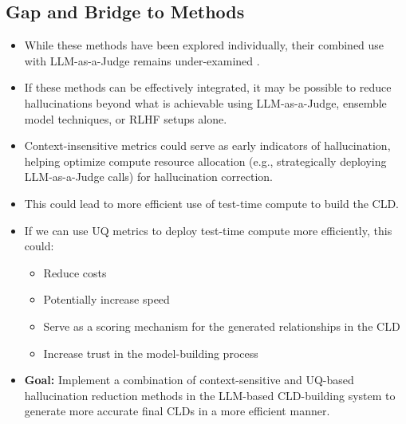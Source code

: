 \documentclass[12pt]{article}
\begin{document}
\subsection{Gap and Bridge to Methods}

\begin{itemize}
    \item While these methods have been explored individually, their combined use with LLM-as-a-Judge remains under-examined \cite{tonmoy2024comprehensive}.
    \item If these methods can be effectively integrated, it may be possible to reduce hallucinations beyond what is achievable using LLM-as-a-Judge, ensemble model techniques, or RLHF setups alone.
    \item Context-insensitive metrics could serve as early indicators of hallucination, helping optimize compute resource allocation (e.g., strategically deploying LLM-as-a-Judge calls) for hallucination correction.
    \item This could lead to more efficient use of test-time compute to build the CLD.
    \item If we can use UQ metrics to deploy test-time compute more efficiently, this could:
    \begin{itemize}
        \item Reduce costs
        \item Potentially increase speed
        \item Serve as a scoring mechanism for the generated relationships in the CLD
        \item Increase trust in the model-building process
    \end{itemize}
    \item \textbf{Goal:} Implement a combination of context-sensitive and UQ-based hallucination reduction methods in the LLM-based CLD-building system to generate more accurate final CLDs in a more efficient manner.
\end{itemize}



\end{document}
